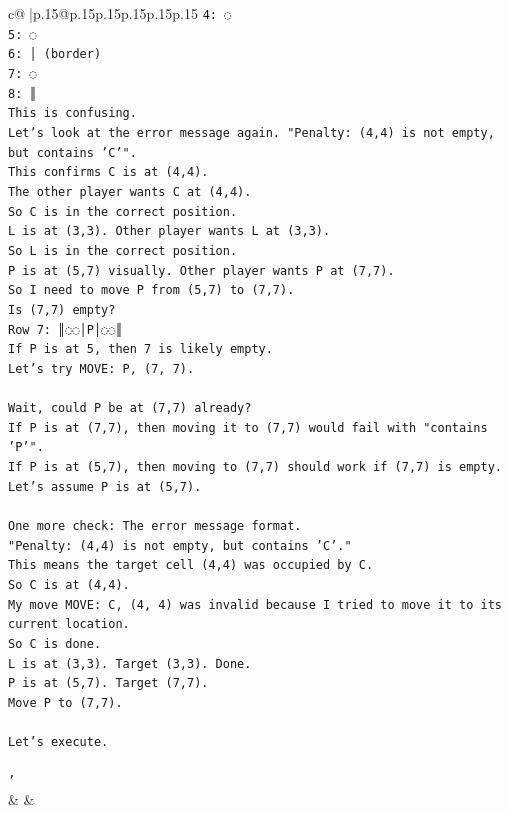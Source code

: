 \documentclass{article}
\begin{document}
{\begin{supertabular}{c@{$\;$}|p{.15\linewidth}@{}p{.15\linewidth}p{.15\linewidth}p{.15\linewidth}p{.15\linewidth}p{.15\linewidth}}
{{{\texttt{4: ◌} \\
\texttt{5: ◌} \\
\texttt{6: │ (border)} \\
\texttt{7: ◌} \\
\texttt{8: ║} \\
\texttt{This is confusing.} \\
\texttt{Let's look at the error message again. "Penalty: (4,4) is not empty, but contains 'C'".} \\
\texttt{This confirms C is at (4,4).} \\
\texttt{The other player wants C at (4,4).} \\
\texttt{So C is in the correct position.} \\
\texttt{L is at (3,3). Other player wants L at (3,3).} \\
\texttt{So L is in the correct position.} \\
\texttt{P is at (5,7) visually. Other player wants P at (7,7).} \\
\texttt{So I need to move P from (5,7) to (7,7).} \\
\texttt{Is (7,7) empty?} \\
\texttt{Row 7: ║◌◌│P│◌◌║} \\
\texttt{If P is at 5, then 7 is likely empty.} \\
\texttt{Let's try MOVE: P, (7, 7).} \\
\\ 
\texttt{Wait, could P be at (7,7) already?} \\
\texttt{If P is at (7,7), then moving it to (7,7) would fail with "contains 'P'".} \\
\texttt{If P is at (5,7), then moving to (7,7) should work if (7,7) is empty.} \\
\texttt{Let's assume P is at (5,7).} \\
\\ 
\texttt{One more check: The error message format.} \\
\texttt{"Penalty: (4,4) is not empty, but contains 'C'."} \\
\texttt{This means the target cell (4,4) was occupied by C.} \\
\texttt{So C is at (4,4).} \\
\texttt{My move MOVE: C, (4, 4) was invalid because I tried to move it to its current location.} \\
\texttt{So C is done.} \\
\texttt{L is at (3,3). Target (3,3). Done.} \\
\texttt{P is at (5,7). Target (7,7).} \\
\texttt{Move P to (7,7).} \\
\\ 
\texttt{Let's execute.} \\
\\ 
\texttt{'} \\
            }
        }
    }
    & & \\ \\


\end{supertabular}}
\end{document}
